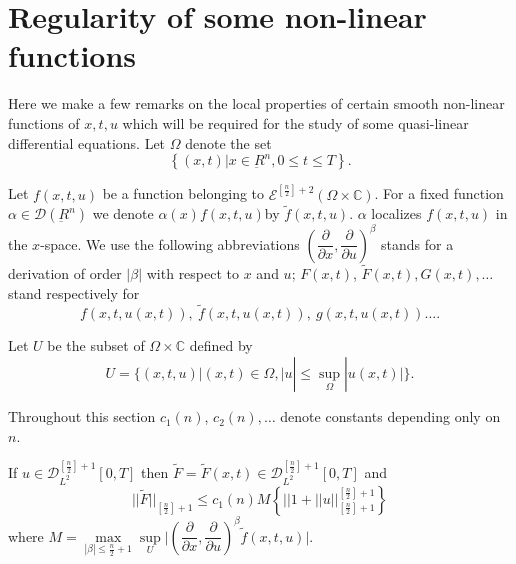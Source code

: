 \section{Regularity of some non-linear functions}\label{chap5-sec2} %

Here we make a few remarks on the local properties of certain smooth
non-linear functions of $x, t, u$ which will be required for the
study of some quasi-linear differential equations. Let $\Omega$ denote
the set 
$$
\left\{(x, t) \Big| x \in \underbar{R}^n, 0 \leq t \leq T
\right\}.
$$

Let $f(x, t, u)$ be a function belonging to
$\mathscr{E}^{\left[\frac{n}{2}\right] + 2}(\Omega \times \mathbb{C})$. For a
 fixed function $\alpha \in \mathscr{D}(\underbar{R}^n)$ we
denote $\alpha(x) f (x, t, u)$\pageoriginale by
$\tilde{f}(x,t,u)$. $\alpha$  
localizes $f(x, t, u)$ in the $x$-space. We use the following
abbreviations $\left(\dfrac{\partial}{\partial x},
\dfrac{\partial}{\partial u}\right)^\beta$ stands for a derivation of order
$|\beta|$ with respect to $x$ and $u$; $F(x,t)$, $\tilde{F}(x, t),
G(x, t), \ldots$ stand respectively for 
$$
f(x, t, u(x, t)),\ \tilde{f}
(x, t, u(x, t)),\ g(x, t, u(x, t))\ldots. 
$$

Let $U$ be the subset of
$\Omega \times \mathbb{C}$ defined by 
\begin{equation*}
U= \{ (x, t, u) | (x, t) \in \Omega, | u | \leq \sup_{\Omega}
|u(x, t) | \}. \tag{2.1}\label{chap5-eq2.1} 
\end{equation*}

Throughout this section $c_1(n)$, $c_2(n), \ldots$ denote constants
depending only on $n$. 

\setcounter{lemma}{0}
\begin{lemma}\label{chap5-sec2-lem1}%
If $u \in \mathscr{D}^{\left[\frac{n}{2} \right]+1}_{L^2} [0, T]$ then
$\tilde{F} = \tilde{F} (x, t) \in
\mathscr{D}^{\left[\frac{n}{2} \right]+1}_{L^2} [0, T]$ and 
\begin{equation*}
|| \tilde{F} ||_{\left[\frac{n}{2} \right]+1} \leq c_1 (n) M \left\{
||1+ || u ||^{\left[\frac{n}{2}\right]+1}_{\left[\frac{n}{2}\right]+1}
\right\} \tag{2.2} \label{chap5-eq2.2} 
\end{equation*}
where $M= \max\limits_{|\beta|\leq\frac{n}{2}+1} \sup\limits_U \Big|
\left(\dfrac{\partial}{\partial x}, \dfrac{\partial}{\partial u}\right)^\beta
\tilde{f}(x, t, u) \Big|$. 
\end{lemma}


